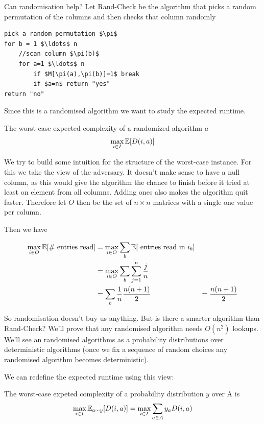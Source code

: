 Can randomisation help? Let {\sc Rand-Check} be the algorithm that picks a random permutation of the columns and then checks that column randomly

\begin{lstlisting}
pick a random permutation $\pi$
for b = 1 $\ldots$ n
	//scan column $\pi(b)$
	for a=1 $\ldots$ n
		if $M[\pi(a),\pi(b)]=1$ break
		if $a=n$ return "yes"
return "no"
\end{lstlisting}

Since this is a randomised algorithm we want to study the expected runtime. 

\begin{Def} The worst-case expected complexity of a randomized algorithm $a$
\[\max_{i\in I} \mathbb{E}[D(i,a)]\]
\end{Def}

We try to build some intuition for the structure of the worst-case instance. For this we take the view of the adversary.
It doesn't make sense to have a null column, as this would give the algorithm the chance to finish before it tried at least on element from all columns. Adding ones also makes the algorithm quit faster. Therefore let $O$ then be the set of $n\times n$ matrices with a single one value per column.

Then we have

\begin{align*}
\max_{i\in O} \mathbb{E}[\text{\# entries read}] &= \max_{i\in O} \sum_b \mathbb{E}[\text{ entries read in } i_b]\\
	&=\max_{i\in O}\sum_b \sum_{j=1}^n \frac jn\\
	&=\sum_b \frac 1n \frac{n(n+1)}{2} 
	&=\frac{n(n+1)}{2}
\end{align*}

So randomisation doesn't buy us anything. But is there a smarter algorithm than {\sc Rand-Check}? We'll prove that any randomised algorithm needs $O(n^2)$ lookups. We'll see an randomised algorithms as a probability distributions over deterministic algorithms (once we fix a sequence of random choices any randomised algorithm becomes deterministic).

We can redefine the expected runtime using this view:

\begin{Def} The worst-case expeted complexity of a probability distribution $y$ over A is
\[\max_{i\in I} \mathbb{E}_{a\sim y}[D(i,a)] = \max_{i\in I} \sum_{a\in A} y_a D(i,a)\]
\end{Def}

